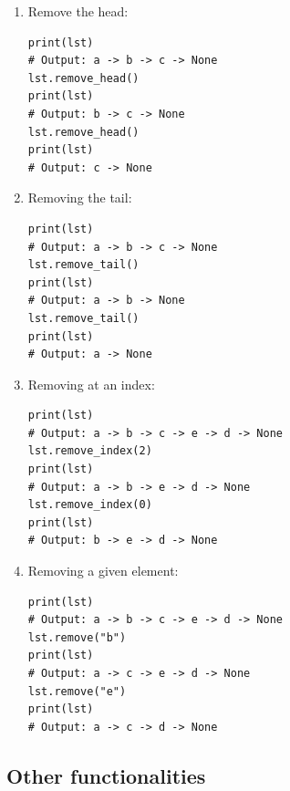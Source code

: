 \documentclass[10pt,a4paper]{article}
\begin{document}
\begin{enumerate}
	\item Remove the head:
\begin{lstlisting}
print(lst)
# Output: a -> b -> c -> None
lst.remove_head()
print(lst)
# Output: b -> c -> None
lst.remove_head()
print(lst)
# Output: c -> None
\end{lstlisting}
	\item Removing the tail:
\begin{lstlisting}
print(lst)
# Output: a -> b -> c -> None
lst.remove_tail()
print(lst)
# Output: a -> b -> None
lst.remove_tail()
print(lst)
# Output: a -> None
\end{lstlisting}
	\item Removing at an index:
\begin{lstlisting}
print(lst)
# Output: a -> b -> c -> e -> d -> None
lst.remove_index(2)
print(lst)
# Output: a -> b -> e -> d -> None
lst.remove_index(0)
print(lst)
# Output: b -> e -> d -> None
\end{lstlisting}
	\item Removing a given element:
\begin{lstlisting}
print(lst)
# Output: a -> b -> c -> e -> d -> None
lst.remove("b")
print(lst)
# Output: a -> c -> e -> d -> None
lst.remove("e")
print(lst)
# Output: a -> c -> d -> None
\end{lstlisting}
\end{enumerate}

\newpage

\subsection*{Other functionalities}
\end{document}
